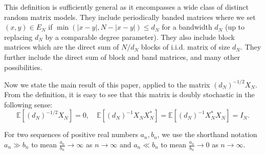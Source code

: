 \documentclass[11pt,reqno]{amsart}
\theoremstyle{plain}
\theoremstyle{remark}
\numberwithin{equation}{section}
\begin{document}
 This definition is sufficiently general as it encompasses a wide class of distinct random matrix models. They include periodically banded matrices where we set $(x,y)\in E_N$ if $\min(|x-y|,N-|x-y|)\leq d_N$ for a bandwidth $d_N$ (up to replacing $d_N$ by a comparable degree parameter). They also include block matrices which are the direct sum of $N/d_N$ blocks of i.i.d. matrix of size $d_N$. They further include the direct sum of block and band matrices, and many other possibilities.  


Now we state the main result of this paper, applied to the matrix $(d_N)^{-1/2}X_N$. From the definition, it is easy to see that this matrix is doubly stochastic in the following sense:
$$
\mathbb{E}[(d_N)^{-1/2}X_N]=0,\quad \mathbb{E}[(d_N)^{-1}X_NX_N^*]=\mathbb{E}[(d_N)^{-1}X_N^*X_N]=I_N.
$$

For two sequences of positive real numbers $a_n,b_n$, we use the shorthand notation $a_n\gg b_n$ to mean $\frac{a_n}{b_n}\to\infty$ as $n\to\infty$ and $a_n\ll b_n$ to mean $\frac{a_n}{b_n}\to 0$ as $n\to\infty$.
\end{document}
